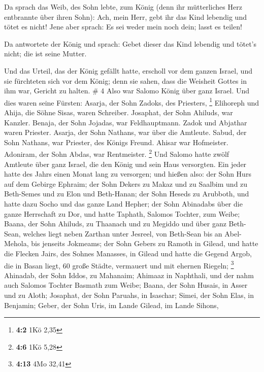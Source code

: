  Da sprach das Weib, des Sohn lebte, zum König (denn ihr
mütterliches Herz entbrannte über ihren Sohn): Ach, mein Herr, gebt ihr
das Kind lebendig und tötet es nicht! Jene aber sprach: Es sei weder
mein noch dein; lasst es teilen!

 Da antwortete der König und sprach: Gebet dieser das Kind
lebendig und tötet's nicht; die ist seine Mutter.

 Und das Urteil, das der König gefällt hatte, erscholl vor
dem ganzen Israel, und sie fürchteten sich vor dem König; denn sie
sahen, dass die Weisheit Gottes in ihm war, Gericht zu halten. \# 4
 Also war Salomo König über ganz Israel.  Und
dies waren seine Fürsten: Asarja, der Sohn Zadoks, des Priesters,
\footnote{\textbf{4:2} 1Kö 2,35}  Elihoreph und Ahija, die
Söhne Sisas, waren Schreiber. Josaphat, der Sohn Ahiluds, war Kanzler.
 Benaja, der Sohn Jojadas, war Feldhauptmann. Zadok und
Abjathar waren Priester.  Asarja, der Sohn Nathans, war über
die Amtleute. Sabud, der Sohn Nathans, war Priester, des Königs Freund.
 Ahisar war Hofmeister. Adoniram, der Sohn Abdas, war
Rentmeister. \footnote{\textbf{4:6} 1Kö 5,28}  Und Salomo
hatte zwölf Amtleute über ganz Israel, die den König und sein Haus
versorgten. Ein jeder hatte des Jahrs einen Monat lang zu versorgen;
 und hießen also: der Sohn Hurs auf dem Gebirge Ephraim;
 der Sohn Dekers zu Makaz und zu Saalbim und zu Beth-Semes
und zu Elon und Beth-Hanan;  der Sohn Heseds zu Arubboth,
und hatte dazu Socho und das ganze Land Hepher;  der Sohn
Abinadabs über die ganze Herrschaft zu Dor, und hatte Taphath, Salomos
Tochter, zum Weibe;  Baana, der Sohn Ahiluds, zu Thaanach
und zu Megiddo und über ganz Beth-Sean, welches liegt neben Zarthan
unter Jesreel, von Beth-Sean bis an Abel-Mehola, bis jenseits Jokmeams;
 der Sohn Gebers zu Ramoth in Gilead, und hatte die Flecken
Jairs, des Sohnes Manasses, in Gilead und hatte die Gegend Argob, die in
Basan liegt, 60 große Städte, vermauert und mit ehernen Riegeln;
\footnote{\textbf{4:13} 4Mo 32,41}  Ahinadab, der Sohn
Iddos, zu Mahanaim;  Ahimaaz in Naphthali, und der nahm
auch Salomos Tochter Basmath zum Weibe;  Baana, der Sohn
Husais, in Asser und zu Aloth;  Josaphat, der Sohn Paruahs,
in Isaschar;  Simei, der Sohn Elas, in Benjamin;
 Geber, der Sohn Uris, im Lande Gilead, im Lande Sihons,
